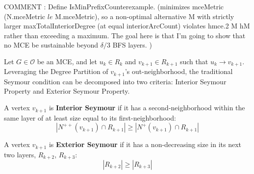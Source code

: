 \documentclass[AMS, Times1COL]{article} %
\newtheorem{lemma}[theorem]{Lemma}
\theoremstyle{definition}
\begin{document}
COMMENT : Define IsMinPrefixCounterexample. (minimizes mceMetric (N.mceMetric $le$ M.mceMetric), so a non-optimal alternative M with strictly larger maxTotalInteriorDegree (at equal interiorArcCount) violates hmce.2 M hM rather than exceeding a maximum. The goal here is that I'm going to show that no MCE be sustainable beyond $\delta /3$ BFS layers. )

Let $G \in \mathcal{O}$ be an MCE, and let $u_k \in R_k$ and $v_{k+1} \in R_{k+1}$ such that $u_k \to v_{k+1}$. Leveraging the Degree Partition of $v_{k+1}$'s out-neighborhood, the traditional Seymour condition can be decomposed into two criteria: Interior Seymour Property and Exterior Seymour Property. 

A vertex $v_{k+1}$ is \textbf{Interior Seymour} if it has a second-neighborhood within the same layer of at least size equal to its first-neighborhood:
$$|N^{++}(v_{k+1}) \cap R_{k+1}| \ge |N^+(v_{k+1}) \cap R_{k+1}|$$

A vertex $v_{k+1}$ is \textbf{Exterior Seymour} if it has a non-decreasing size in its next two layers, $R_{k+2}$, $R_{k+3}$:
$$|R_{k+2}| \ge |R_{k+3}|$$

	
			
\end{document}
